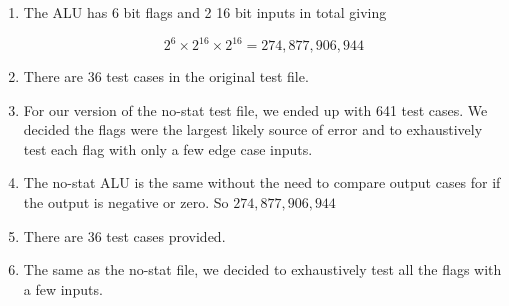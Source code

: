 \documentclass[titlepage]{article}
\begin{document}
\begin{enumerate}[label=(\alph*)]
  \item{
    The ALU has 6 bit flags and 2 16 bit inputs in total giving

    $$2^6 \times 2^16 \times 2^16 = 274,877,906,944$$
  }
  \item{
    There are 36 test cases in the original test file.
  }
  \item{
    For our version of the no-stat test file, we ended up with 641 test cases.
    We decided the flags were the largest likely source of error and to
    exhaustively test each flag with only a few edge case inputs.
  }
  \item{
    The no-stat ALU is the same without the need to compare output cases for if
    the output is negative or zero.  So $274,877,906,944$
  }
  \item{
    There are 36 test cases provided.
  }
  \item{
    The same as the no-stat file, we decided to exhaustively test all the flags
    with a few inputs.
  }
\end{enumerate}
\end{document}
